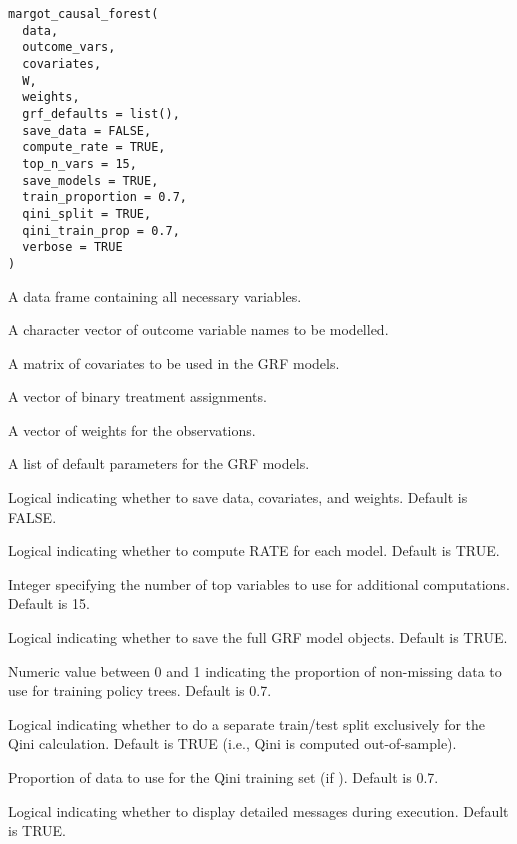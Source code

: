 \documentclass[a4paper]{book}
\begin{document}
%
\begin{Usage}
\begin{verbatim}
margot_causal_forest(
  data,
  outcome_vars,
  covariates,
  W,
  weights,
  grf_defaults = list(),
  save_data = FALSE,
  compute_rate = TRUE,
  top_n_vars = 15,
  save_models = TRUE,
  train_proportion = 0.7,
  qini_split = TRUE,
  qini_train_prop = 0.7,
  verbose = TRUE
)
\end{verbatim}
\end{Usage}
%
\begin{Arguments}
\begin{ldescription}
\item[\code{data}] A data frame containing all necessary variables.

\item[\code{outcome\_vars}] A character vector of outcome variable names to be modelled.

\item[\code{covariates}] A matrix of covariates to be used in the GRF models.

\item[\code{W}] A vector of binary treatment assignments.

\item[\code{weights}] A vector of weights for the observations.

\item[\code{grf\_defaults}] A list of default parameters for the GRF models.

\item[\code{save\_data}] Logical indicating whether to save data, covariates, and weights. Default is FALSE.

\item[\code{compute\_rate}] Logical indicating whether to compute RATE for each model. Default is TRUE.

\item[\code{top\_n\_vars}] Integer specifying the number of top variables to use for additional computations. Default is 15.

\item[\code{save\_models}] Logical indicating whether to save the full GRF model objects. Default is TRUE.

\item[\code{train\_proportion}] Numeric value between 0 and 1 indicating the proportion of non-missing data to use for
training policy trees. Default is 0.7.

\item[\code{qini\_split}] Logical indicating whether to do a separate train/test split exclusively for the Qini
calculation. Default is TRUE (i.e., Qini is computed out-of-sample).

\item[\code{qini\_train\_prop}] Proportion of data to use for the Qini training set (if ). Default is 0.7.

\item[\code{verbose}] Logical indicating whether to display detailed messages during execution. Default is TRUE.
\end{ldescription}
\end{Arguments}
\end{document}
